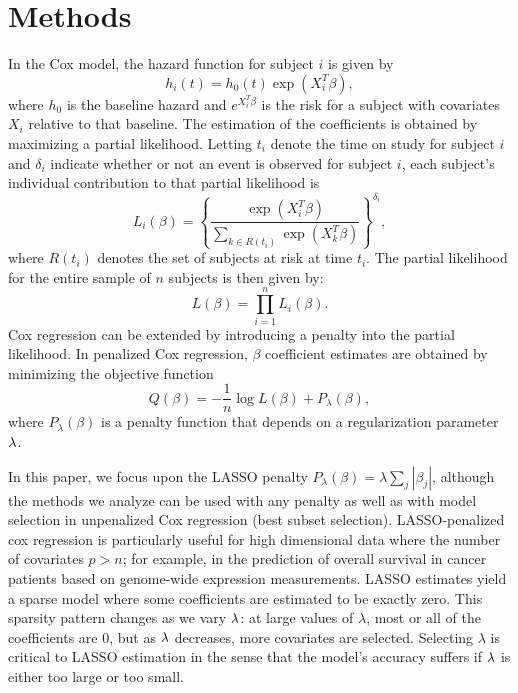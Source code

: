 \section{Methods}

\par In the Cox model, the hazard function for subject $i$ is given by 
\begin{equation*}
  h_{i}(t) = h_{0}(t) \exp( X_{i}^{T} \beta),
\end{equation*} 
where $h_{0}$ is the baseline hazard and $e^{X_i^{T} \beta}$ is the risk for a subject with covariates $X_i$ relative to that baseline.  The estimation of the coefficients is obtained by maximizing a partial likelihood.  Letting $t_i$ denote the time on study for subject $i$ and $\delta_{i}$ indicate whether or not an event is observed for subject $i$, each subject's individual contribution to that partial likelihood is
\begin{equation}
  \label{eq:cox-pl-subj}
  L_{i}(\beta) = \left \{\frac{\exp ( X_{i}^{T} \beta)}{\sum_{ k \in R(t_{i})}\exp ( X_{k}^{T} \beta)}\right \}^{\delta_{i}},
\end{equation}
where $R(t_{i})$ denotes the set of subjects at risk at time $t_{i}$.  The partial likelihood for the entire sample of $n$ subjects is then given by:
\begin{equation}
  \label{eq:cox-pl-sum}
  L(\beta) =\prod_{i = 1}^{n} L_{i}(\beta).
\end{equation}
Cox regression can be extended by introducing a penalty into the partial likelihood.  In penalized Cox regression, $\beta$ coefficient estimates are obtained by minimizing the objective function
\begin{equation}
  \label{eq:obj}
  Q(\beta) = - \frac{1}{n} \log L(\beta) + P_{\lambda}(\beta),
\end{equation}
where $P_{\lambda}(\beta)$ is a penalty function that depends on a regularization parameter $\lambda$.

\par In this paper, we focus upon the LASSO penalty $P_{\lambda}(\beta) = \lambda \sum_{j} |\beta_{j}|$, although the methods we analyze can be used with any penalty as well as with model selection in unpenalized Cox regression (best subset selection). LASSO-penalized cox regression is particularly useful for high dimensional data where the number of covariates $p > n$; for example, in the prediction of overall survival in cancer patients based on genome-wide expression measurements. LASSO estimates yield a sparse model where some coefficients are estimated to be exactly zero. This sparsity pattern changes as we vary $\lambda$: at large values of $\lambda$, most or all of the coefficients are 0, but as $\lambda$ decreases, more covariates are selected. Selecting $\lambda$ is critical to LASSO estimation in the sense that the model's accuracy suffers if $\lambda$ is either too large or too small.

